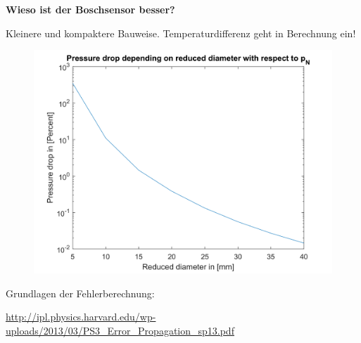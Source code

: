 \documentclass[a4paper,10pt,oneside]{article}
\begin{document}
\textbf{Wieso ist der Boschsensor besser?}

Kleinere und kompaktere Bauweise. Temperaturdifferenz geht in Berechnung ein!

\begin{figure}
\centering
\includegraphics[scale=0.8]{img/PressureDrop}
\caption{}
\label{fig:PressureDrop}
\end{figure}

\vfill

Grundlagen der Fehlerberechnung: 

\url{http://ipl.physics.harvard.edu/wp-uploads/2013/03/PS3_Error_Propagation_sp13.pdf}
\end{document}
